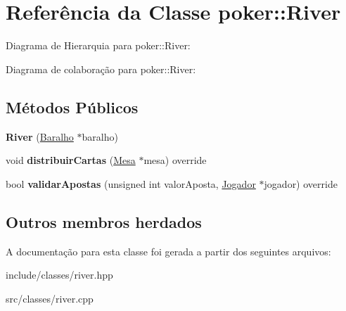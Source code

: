 \hypertarget{classpoker_1_1River}{}\section{Referência da Classe poker\+:\+:River}
\label{classpoker_1_1River}


Diagrama de Hierarquia para poker\+:\+:River\+:


Diagrama de colaboração para poker\+:\+:River\+:
\subsection*{Métodos Públicos}
\begin{DoxyCompactItemize}
\item 
\mbox{\label{classpoker_1_1River_aae65599c00770c6de751ce7951024b92}} 
{\bfseries River} (\hyperlink{classpoker_1_1Baralho}{Baralho} $\ast$baralho)
\item 
\mbox{\label{classpoker_1_1River_a18acb6cd57c1d86bb94630f99406a01a}} 
void {\bfseries distribuir\+Cartas} (\hyperlink{classpoker_1_1Mesa}{Mesa} $\ast$mesa) override
\item 
\mbox{\label{classpoker_1_1River_a857a1e41b593aabe5fd152b4dd316c76}} 
bool {\bfseries validar\+Apostas} (unsigned int valor\+Aposta, \hyperlink{classpoker_1_1Jogador}{Jogador} $\ast$jogador) override
\end{DoxyCompactItemize}
\subsection*{Outros membros herdados}


A documentação para esta classe foi gerada a partir dos seguintes arquivos\+:\begin{DoxyCompactItemize}
\item 
include/classes/river.\+hpp\item 
src/classes/river.\+cpp\end{DoxyCompactItemize}
